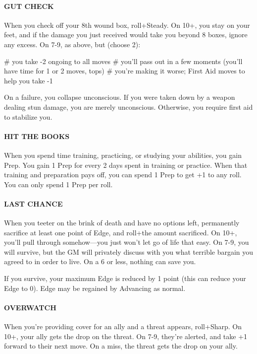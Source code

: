 \paragraph{GUT CHECK}
When you check off your 8th wound box, roll+Steady. On 10+, you stay on your feet, and if the damage you just received would take you beyond 8 boxes, ignore any excess. On 7-9, as above, but (choose 2):
\begin{easylist}
    # you take -2 ongoing to all moves
    # you’ll pass out in a few moments (you’ll have time for 1 or 2 moves, tops)
    # you’re making it worse; First Aid moves to help you take -1
\end{easylist}
On a failure, you collapse unconscious. If you were taken down by a weapon dealing stun damage, you are merely unconscious. Otherwise, you require first aid to stabilize you.

\paragraph{HIT THE BOOKS}
When you spend time training, practicing, or studying your abilities, you gain Prep. You gain 1 Prep for every 2 days spent in training or practice. When that training and preparation pays off, you can spend 1 Prep to get +1 to any roll. You can only spend 1 Prep per roll.

\paragraph{LAST CHANCE}
When you teeter on the brink of death and have no options left, permanently sacrifice at least one point of Edge, and roll+the amount sacrificed. On 10+, you’ll pull through somehow—you just won’t let go of life that easy. On 7-9, you will survive, but the GM will privately discuss with you what terrible bargain you agreed to in order to live. On a 6 or less, nothing can save you.

If you survive, your maximum Edge is reduced by 1 point (this can reduce your Edge to 0). Edge may be regained by Advancing as normal.

\paragraph{OVERWATCH}
When you’re providing cover for an ally and a threat appears, roll+Sharp. On 10+, your ally gets the drop on the threat. On 7-9, they’re alerted, and take +1 forward to their next move. On a miss, the threat gets the drop on your ally.

